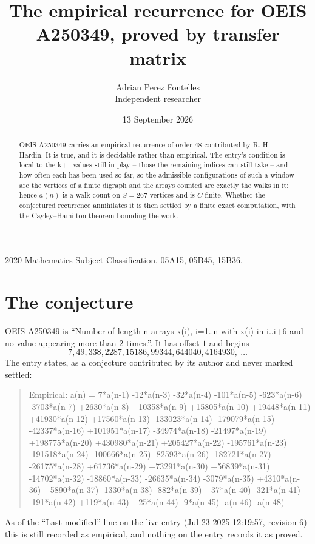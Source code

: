 \documentclass[11pt,a4paper]{article}
\title{The empirical recurrence for OEIS A250349, proved by transfer matrix}
\author{Adrian Perez Fontelles\\ \small Independent researcher}
\date{13 September 2026}
\theoremstyle{plain}
\theoremstyle{definition}
\begin{document}
\maketitle

\begin{abstract}
OEIS A250349 carries an empirical recurrence of order $48$ contributed by R. H. Hardin. It is
true, and it is decidable rather than empirical. The entry's condition is local to the k+1 values still in play -- those the remaining indices can still take -- and how often each has been used so far, so
the admissible configurations of such a window are the vertices of a finite digraph and the
arrays counted are exactly the walks in it; hence $a(n)$ is a walk count on $S=267$ vertices
and is $C$-finite. Whether the conjectured recurrence annihilates it is then settled by a
finite exact computation, with the Cayley--Hamilton theorem bounding the work.
\end{abstract}

\noindent\small 2020 Mathematics Subject Classification. 05A15, 05B45, 15B36.\normalsize

\section{The conjecture}

OEIS A250349 is ``Number of length n arrays x(i), i=1..n with x(i) in i..i+6 and no value appearing more than 2 times.''. It has offset $1$ and begins
\[
7, 49, 338, 2287, 15186, 99344, 644040, 4164930,\ \dots
\]
The entry states, as a conjecture contributed by its author and never marked settled:
\begin{quote}
Empirical: a(n) = 7*a(n-1) -12*a(n-3) -32*a(n-4) -101*a(n-5) -623*a(n-6) -3703*a(n-7) +2630*a(n-8) +10358*a(n-9) +15805*a(n-10) +19448*a(n-11) +41930*a(n-12) +17560*a(n-13) -133023*a(n-14) -179079*a(n-15) -42337*a(n-16) +101951*a(n-17) -34974*a(n-18) -21497*a(n-19) +198775*a(n-20) +430980*a(n-21) +205427*a(n-22) -195761*a(n-23) -191518*a(n-24) -100666*a(n-25) -82593*a(n-26) -182721*a(n-27) -26175*a(n-28) +61736*a(n-29) +73291*a(n-30) +56839*a(n-31) -14702*a(n-32) -18860*a(n-33) -26635*a(n-34) -3079*a(n-35) +4310*a(n-36) +5890*a(n-37) -1330*a(n-38) -882*a(n-39) +37*a(n-40) -321*a(n-41) -191*a(n-42) +119*a(n-43) +25*a(n-44) -9*a(n-45) -a(n-46) -a(n-48)
\end{quote}
As of the ``Last modified'' line on the live entry (Jul 23 2025 12:19:57, revision 6) this is still
recorded as empirical, and nothing on the entry records it as proved.
\end{document}
